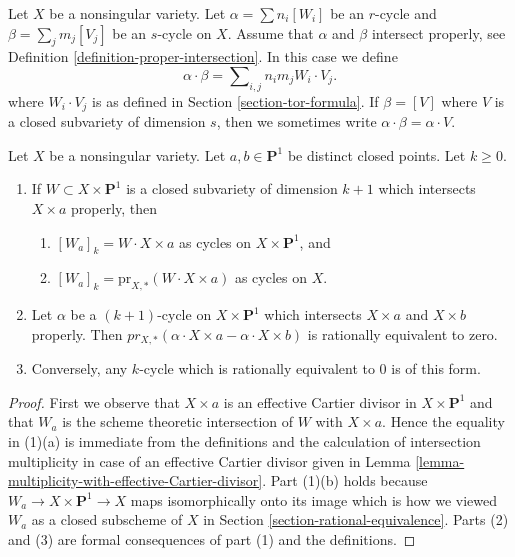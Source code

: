 \noindent
Let $X$ be a nonsingular variety. Let
$\alpha = \sum n_i [W_i]$ be an $r$-cycle and
$\beta = \sum_j m_j [V_j]$ be an $s$-cycle on $X$.
Assume that $\alpha$ and $\beta$ intersect properly, see
Definition \ref{definition-proper-intersection}.
In this case we define
$$
\alpha \cdot \beta = \sum\nolimits_{i,j} n_i m_j W_i \cdot V_j.
$$
where $W_i \cdot V_j$ is as defined in Section \ref{section-tor-formula}.
If $\beta = [V]$ where $V$ is a closed subvariety of dimension $s$,
then we sometimes write $\alpha \cdot \beta = \alpha \cdot V$.

\begin{lemma}
\label{lemma-rational-equivalence-and-intersection}
Let $X$ be a nonsingular variety. Let $a, b \in \mathbf{P}^1$
be distinct closed points. Let $k \geq 0$.
\begin{enumerate}
\item If $W \subset X \times \mathbf{P}^1$ is a closed subvariety
of dimension $k + 1$ which intersects $X \times a$ properly, then
\begin{enumerate}
\item $[W_a]_k = W \cdot X \times a$ as cycles on $X \times \mathbf{P}^1$, and
\item $[W_a]_k = \text{pr}_{X, *}(W \cdot X \times a)$ as cycles on $X$.
\end{enumerate}
\item Let $\alpha$ be a $(k + 1)$-cycle on $X \times \mathbf{P}^1$
which intersects $X \times a$ and $X \times b$ properly. Then
$pr_{X,*}( \alpha \cdot X \times a - \alpha \cdot X \times b)$
is rationally equivalent to zero.
\item Conversely, any $k$-cycle which is
rationally equivalent to $0$ is of this form.
\end{enumerate}
\end{lemma}

\begin{proof}
First we observe that $X \times a$ is an effective Cartier divisor in
$X \times \mathbf{P}^1$ and that $W_a$ is the scheme theoretic intersection
of $W$ with $X \times a$. Hence the equality in (1)(a) is
immediate from the definitions and the calculation of intersection
multiplicity in case of an effective Cartier divisor given in
Lemma \ref{lemma-multiplicity-with-effective-Cartier-divisor}.
Part (1)(b) holds because $W_a \to X \times \mathbf{P}^1 \to X$ maps
isomorphically onto its image which is how we viewed $W_a$
as a closed subscheme of $X$ in Section \ref{section-rational-equivalence}.
Parts (2) and (3) are formal consequences of part (1) and the definitions.
\end{proof}

